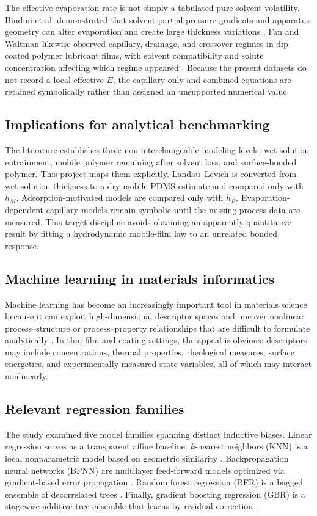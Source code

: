 \documentclass[11pt]{article}
\begin{document}
The effective evaporation rate is not simply a tabulated pure-solvent volatility. Bindini et al. demonstrated that solvent partial-pressure gradients and apparatus geometry can alter evaporation and create large thickness variations \cite{bindini2017}. Fan and Waltman likewise observed capillary, drainage, and crossover regimes in dip-coated polymer lubricant films, with solvent compatibility and solute concentration affecting which regime appeared \cite{fan2018}. Because the present datasets do not record a local effective $E$, the capillary-only and combined equations are retained symbolically rather than assigned an unsupported numerical value.

\subsection{Implications for analytical benchmarking}
The literature establishes three non-interchangeable modeling levels: wet-solution entrainment, mobile polymer remaining after solvent loss, and surface-bonded polymer. This project maps them explicitly. Landau--Levich is converted from wet-solution thickness to a dry mobile-PDMS estimate and compared only with $h_M$. Adsorption-motivated models are compared only with $h_B$. Evaporation-dependent capillary models remain symbolic until the missing process data are measured. This target discipline avoids obtaining an apparently quantitative result by fitting a hydrodynamic mobile-film law to an unrelated bonded response.

\subsection{Machine learning in materials informatics}
Machine learning has become an increasingly important tool in materials science because it can exploit high-dimensional descriptor spaces and uncover nonlinear process--structure or process--property relationships that are difficult to formulate analytically \cite{schmidt2019,kailkhura2019}. In thin-film and coating settings, the appeal is obvious: descriptors may include concentrations, thermal properties, rheological measures, surface energetics, and experimentally measured state variables, all of which may interact nonlinearly.

\subsection{Relevant regression families}
The study examined five model families spanning distinct inductive biases. Linear
regression serves as a transparent affine baseline. $k$-nearest neighbors (KNN) is
a local nonparametric model based on geometric similarity \cite{aha1991}.
Backpropagation neural networks (BPNN) are multilayer feed-forward models optimized
via gradient-based error propagation \cite{rumelhart1986}. Random forest regression
(RFR) is a bagged ensemble of decorrelated trees \cite{breiman2001}. Finally,
gradient boosting regression (GBR) is a stagewise additive tree ensemble that learns
by residual correction \cite{friedman2001}.
\end{document}
